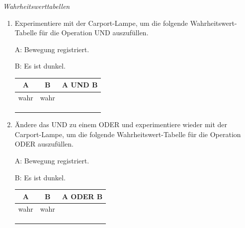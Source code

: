 \newpage
\begin{aufgabe} \emph{Wahrheitswerttabellen}
	\begin{enumerate}[label=\alph*), itemsep=0ex, parsep=0ex]
		\item Experimentiere mit der Carport-Lampe, um die folgende Wahrheitswert-Tabelle für die Operation UND auszufüllen.
		
			\medskip
			\begin{minipage}{0.4\textwidth}
				A: Bewegung registriert.
				
				B: Es ist dunkel.
			\end{minipage}
			\hfill
			\begin{minipage}{0.4\textwidth}
				\centering
				\begin{tabular}{c | c | c}
					\textbf{A} & \textbf{B} & \textbf{A UND B} \\ \hline
					wahr & wahr &  \\
					&  &  \\
					&  &  \\
					&  &  \\  
				\end{tabular}
			\end{minipage}
			\hfill
		
		\medskip
		\item Ändere das UND zu einem ODER und experimentiere wieder mit der Carport-Lampe, um die folgende Wahrheitswert-Tabelle für die Operation ODER auszufüllen.
		
			\medskip
			\begin{minipage}{0.4\textwidth}
				A: Bewegung registriert.
				
				B: Es ist dunkel.
			\end{minipage}
			\hfill
			\begin{minipage}{0.4\textwidth}
				\centering
				\begin{tabular}{c | c | c}
					\textbf{A} & \textbf{B} & \textbf{A ODER B} \\ \hline
					wahr & wahr &  \\
					&  &  \\
					&  &  \\
					&  &  \\  
				\end{tabular}
			\end{minipage}
			\hfill
		

\end{enumerate}
\end{aufgabe}
